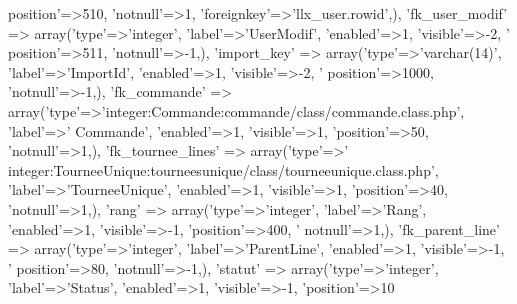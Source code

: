 \begin{DoxyCode}
{      position'}=>510, \textcolor{stringliteral}{'notnull'}=>1, \textcolor{stringliteral}{'foreignkey'}=>\textcolor{stringliteral}{'llx\_user.rowid'},),
        \textcolor{stringliteral}{'fk\_user\_modif'} => array(\textcolor{stringliteral}{'type'}=>\textcolor{stringliteral}{'integer'}, \textcolor{stringliteral}{'label'}=>\textcolor{stringliteral}{'UserModif'}, \textcolor{stringliteral}{'enabled'}=>1, \textcolor{stringliteral}{'visible'}=>-2, \textcolor{stringliteral}{'
      position'}=>511, \textcolor{stringliteral}{'notnull'}=>-1,),
        \textcolor{stringliteral}{'import\_key'} => array(\textcolor{stringliteral}{'type'}=>\textcolor{stringliteral}{'varchar(14)'}, \textcolor{stringliteral}{'label'}=>\textcolor{stringliteral}{'ImportId'}, \textcolor{stringliteral}{'enabled'}=>1, \textcolor{stringliteral}{'visible'}=>-2, \textcolor{stringliteral}{'
      position'}=>1000, \textcolor{stringliteral}{'notnull'}=>-1,),
        \textcolor{stringliteral}{'fk\_commande'} => array(\textcolor{stringliteral}{'type'}=>\textcolor{stringliteral}{'integer:Commande:commande/class/commande.class.php'}, \textcolor{stringliteral}{'label'}=>\textcolor{stringliteral}{'
      Commande'}, \textcolor{stringliteral}{'enabled'}=>1, \textcolor{stringliteral}{'visible'}=>1, \textcolor{stringliteral}{'position'}=>50, \textcolor{stringliteral}{'notnull'}=>1,),
        \textcolor{stringliteral}{'fk\_tournee\_lines'} => array(\textcolor{stringliteral}{'type'}=>\textcolor{stringliteral}{'
      integer:TourneeUnique:tourneesunique/class/tourneeunique.class.php'}, \textcolor{stringliteral}{'label'}=>\textcolor{stringliteral}{'TourneeUnique'}, \textcolor{stringliteral}{'enabled'}=>1, \textcolor{stringliteral}{'visible'}=>1, \textcolor{stringliteral}{'position'}=>40, \textcolor{stringliteral}{'notnull'}=>1,),
        \textcolor{stringliteral}{'rang'} => array(\textcolor{stringliteral}{'type'}=>\textcolor{stringliteral}{'integer'}, \textcolor{stringliteral}{'label'}=>\textcolor{stringliteral}{'Rang'}, \textcolor{stringliteral}{'enabled'}=>1, \textcolor{stringliteral}{'visible'}=>-1, \textcolor{stringliteral}{'position'}=>400, \textcolor{stringliteral}{'
      notnull'}=>1,),
        \textcolor{stringliteral}{'fk\_parent\_line'} => array(\textcolor{stringliteral}{'type'}=>\textcolor{stringliteral}{'integer'}, \textcolor{stringliteral}{'label'}=>\textcolor{stringliteral}{'ParentLine'}, \textcolor{stringliteral}{'enabled'}=>1, \textcolor{stringliteral}{'visible'}=>-1, \textcolor{stringliteral}{'
      position'}=>80, \textcolor{stringliteral}{'notnull'}=>-1,),
        \textcolor{stringliteral}{'statut'} => array(\textcolor{stringliteral}{'type'}=>\textcolor{stringliteral}{'integer'}, \textcolor{stringliteral}{'label'}=>\textcolor{stringliteral}{'Status'}, \textcolor{stringliteral}{'enabled'}=>1, \textcolor{stringliteral}{'visible'}=>-1, \textcolor{stringliteral}{'position'}=>10

\end{DoxyCode}
